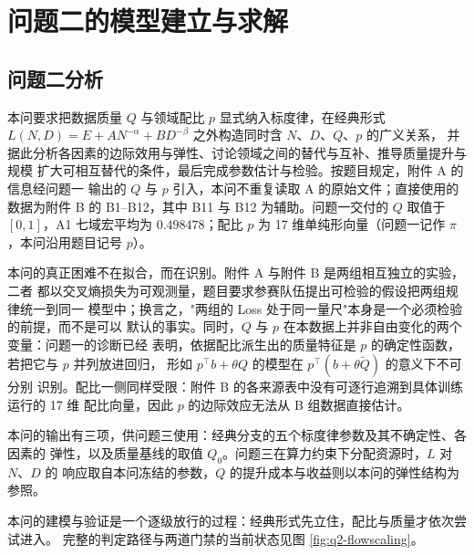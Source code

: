 \documentclass[bwprint]{gmcmthesis}
\numberwithin{equation}{section}
\numberwithin{figure}{section}
\numberwithin{table}{section}
\begin{document}
\section{问题二的模型建立与求解}



\subsection{问题二分析}

本问要求把数据质量 $Q$ 与领域配比 $p$ 显式纳入标度律，在经典形式
$L(N,D)=E+AN^{-\alpha}+BD^{-\beta}$ 之外构造同时含 $N$、$D$、$Q$、$p$ 的广义关系，
并据此分析各因素的边际效用与弹性、讨论领域之间的替代与互补、推导质量提升与规模
扩大可相互替代的条件，最后完成参数估计与检验。按题目规定，附件 A 的信息经问题一
输出的 $Q$ 与 $p$ 引入，本问不重复读取 A 的原始文件；直接使用的数据为附件 B 的
B1--B12，其中 B11 与 B12 为辅助。问题一交付的 $Q$ 取值于 $[0,1]$，A1 七域宏平均为
$0.498478$；配比 $p$ 为 17 维单纯形向量（问题一记作 $\pi$，本问沿用题目记号 $p$）。

本问的真正困难不在拟合，而在识别。附件 A 与附件 B 是两组相互独立的实验，二者
都以交叉熵损失为可观测量，题目要求参赛队伍提出可检验的假设把两组规律统一到同一
模型中；换言之，"两组的 Loss 处于同一量尺"本身是一个必须检验的前提，而不是可以
默认的事实。同时，$Q$ 与 $p$ 在本数据上并非自由变化的两个变量：问题一的诊断已经
表明，依据配比派生出的质量特征是 $p$ 的确定性函数，若把它与 $p$ 并列放进回归，
形如 $p^{\top}b+\theta Q$ 的模型在 $p^{\top}(b+\theta\tilde Q)$ 的意义下不可分别
识别。配比一侧同样受限：附件 B 的各来源表中没有可逐行追溯到具体训练运行的 17 维
配比向量，因此 $p$ 的边际效应无法从 B 组数据直接估计。

本问的输出有三项，供问题三使用：经典分支的五个标度律参数及其不确定性、各因素的
弹性，以及质量基线的取值 $Q_0$。问题三在算力约束下分配资源时，$L$ 对 $N$、$D$ 的
响应取自本问冻结的参数，$Q$ 的提升成本与收益则以本问的弹性结构为参照。

本问的建模与验证是一个逐级放行的过程：经典形式先立住，配比与质量才依次尝试进入。
完整的判定路径与两道门禁的当前状态见图 \ref{fig:q2-flowscaling}。
\end{document}

